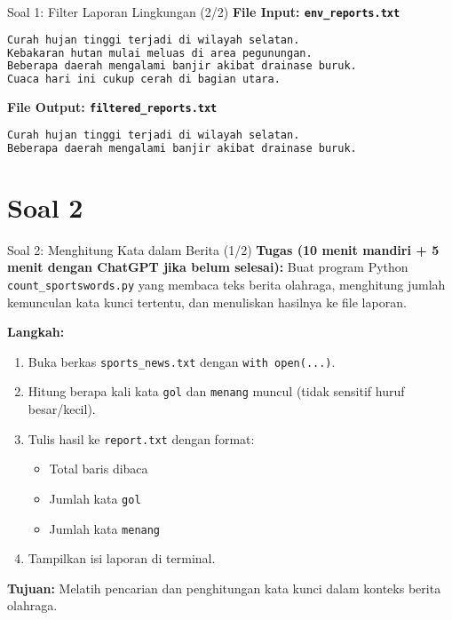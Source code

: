 \documentclass[aspectratio=169, table]{beamer}
\begin{document}
\begin{frame}[fragile]{Soal 1: Filter Laporan Lingkungan (2/2)}
\vspace{15pt}
\textbf{File Input: \texttt{env\_reports.txt}}
\begin{lstlisting}[language=bash,basicstyle=\ttfamily\small]
Curah hujan tinggi terjadi di wilayah selatan.
Kebakaran hutan mulai meluas di area pegunungan.
Beberapa daerah mengalami banjir akibat drainase buruk.
Cuaca hari ini cukup cerah di bagian utara.
\end{lstlisting}

\textbf{File Output: \texttt{filtered\_reports.txt}}
\begin{lstlisting}[language=bash,basicstyle=\ttfamily\small]
Curah hujan tinggi terjadi di wilayah selatan.
Beberapa daerah mengalami banjir akibat drainase buruk.
\end{lstlisting}
\end{frame}


\section{Soal 2}
\begin{frame}[fragile]{Soal 2: Menghitung Kata dalam Berita (1/2)}
\vspace{15pt}
\textbf{Tugas (10 menit mandiri + 5 menit dengan ChatGPT jika belum selesai):}  
Buat program Python \texttt{count\_sportswords.py} yang membaca teks berita olahraga, menghitung jumlah kemunculan kata kunci tertentu, dan menuliskan hasilnya ke file laporan.

\textbf{Langkah:}
\begin{enumerate}
  \item Buka berkas \texttt{sports\_news.txt} dengan \texttt{with open(...)}.
  \item Hitung berapa kali kata \texttt{gol} dan \texttt{menang} muncul  
        (tidak sensitif huruf besar/kecil).
  \item Tulis hasil ke \texttt{report.txt} dengan format:
        \begin{itemize}
          \item Total baris dibaca
          \item Jumlah kata \texttt{gol}
          \item Jumlah kata \texttt{menang}
        \end{itemize}
  \item Tampilkan isi laporan di terminal.
\end{enumerate}

\textbf{Tujuan:}  
Melatih pencarian dan penghitungan kata kunci dalam konteks berita olahraga.
\end{frame}
\end{document}
